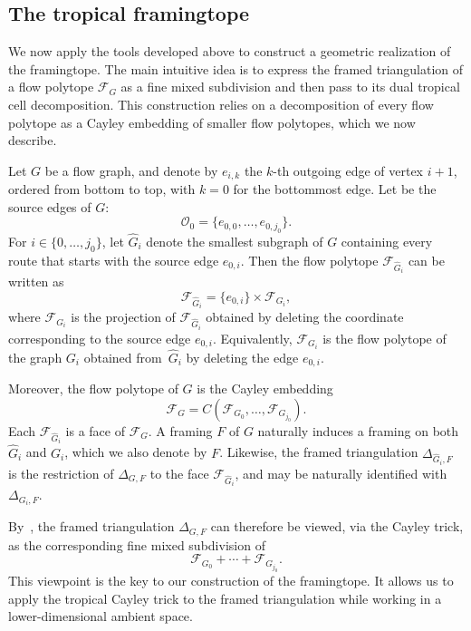 \documentclass[12pt, reqno]{amsart}
\theoremstyle{plain}
\theoremstyle{definition}
\numberwithin{equation}{section}
\newcommand\calF{\mathcal{F}}
\begin{document}
\subsection{The tropical framingtope}

We now apply the tools developed above to construct a geometric realization of the framingtope. The main intuitive idea is to express the framed triangulation of a flow polytope $\calF_G$ as a fine mixed subdivision and then pass to its dual tropical cell decomposition. This construction relies on a decomposition of every flow polytope as a Cayley embedding of smaller flow polytopes, which we now describe.

Let $G$ be a flow graph, and denote by $e_{i,k}$ the $k$-th outgoing edge of vertex $i+1$, ordered from bottom to top, with $k=0$ for the bottommost edge. Let be the source edges of $G$:
\[
\mathcal{O}_0=\{e_{0,0},\ldots,e_{0,j_0}\}.
\]
For $i\in\{0,\dots,j_0\}$, let $\hat G_i$ denote the smallest subgraph of $G$ containing every route that starts with the source edge $e_{0,i}$. Then the flow polytope $\calF_{\hat G_i}$ can be written as
\[
\calF_{\hat G_i} = \{e_{0,i}\}\times\calF_{G_i},
\]
where $\calF_{G_i}$ is the projection of $\calF_{\hat G_i}$ obtained by deleting the coordinate corresponding to the source edge $e_{0,i}$. Equivalently, $\calF_{G_i}$ is the flow polytope of the graph $G_i$ obtained from~$\hat G_i$ by deleting the edge $e_{0,i}$.

Moreover, the flow polytope of $G$ is the Cayley embedding
\begin{equation}\label{eq_Cayley_flowPolytope}
\calF_G = C(\calF_{G_0},\ldots,\calF_{G_{j_0}}).
\end{equation}
Each $\calF_{\hat G_i}$ is a face of $\calF_G$. A framing $F$ of $G$ naturally induces a framing on both $\hat G_i$ and $G_i$, which we also denote by $F$. Likewise, the framed triangulation $\Delta_{\hat G_i,F}$ is the restriction of $\Delta_{G,F}$ to the face $\calF_{\hat G_i}$, and may be naturally identified with $\Delta_{G_i,F}$.

By~, the framed triangulation $\Delta_{G,F}$ can therefore be viewed, via the Cayley trick, as the corresponding fine mixed subdivision of
\begin{equation}
\calF_{G_0}+\cdots+\calF_{G_{j_0}}.    
\end{equation}
This viewpoint is the key to our construction of the framingtope. It allows us to apply the tropical Cayley trick to the framed triangulation while working in a lower-dimensional ambient space.
\end{document}
